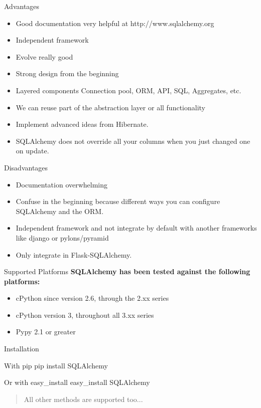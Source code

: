 \documentclass[seagull]{beamer}
\begin{document}
\begin{frame}{Advantages}
\begin{itemize}
	\item Good documentation very helpful at http://www.sqlalchemy.org
	\item Independent framework
	\item Evolve really good
	\item Strong design from the beginning
	\item Layered components Connection pool, ORM, API, SQL, Aggregates, etc.
	\item We can reuse part of the abstraction layer or all functionality
	\item Implement advanced ideas from Hibernate.
	\item SQLAlchemy does not override all your columns when you just changed one on update.
\end{itemize}
\end{frame}

\begin{frame}{Disadvantages}
\begin{itemize}
	\item Documentation overwhelming
	\item Confuse in the beginning because different ways you can configure SQLAlchemy and the ORM.
	\item Independent framework and not integrate by default with another frameworks like django or pylons/pyramid
	\item Only integrate in Flask-SQLAlchemy.
\end{itemize}
\end{frame}

\begin{frame}{Supported Platforms}
	\textbf{SQLAlchemy has been tested against the following platforms:}
	\begin{itemize}
		\item cPython since version 2.6, through the 2.xx series
		\item cPython version 3, throughout all 3.xx series
		\item Pypy 2.1 or greater
	\end{itemize}
\end{frame}
\begin{frame}{Installation}
	\begin{block}{With pip}
		pip install SQLAlchemy
	\end{block} 
	\begin{block}{Or with easy\_install}
		easy\_install SQLAlchemy
	\end{block}
	\begin{quote}
	All other methods are supported too...
	\end{quote}
\end{frame}
\end{document}
